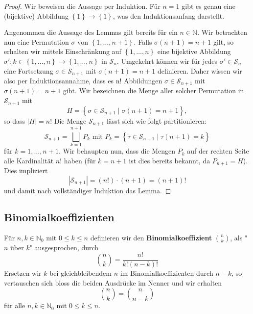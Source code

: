 \documentclass[../Analysis1_script.tex]{subfiles}
\begin{document}
\begin{proof}
	Wir beweisen die Aussage per Induktion. Für $n=1$ gibt es genau eine (bijektive) Abbildung $\left \lbrace {1} \right \rbrace \to \left \lbrace {1} \right \rbrace$, was den Induktionsanfang darstellt. 
	
	Angenommen die Aussage des Lemmas gilt bereits für ein $n\in \mathbb {N}$. Wir betrachten nun eine Permutation $\sigma$ von $\left \lbrace {1,\ldots ,n+1} \right \rbrace$. Falls $\sigma (n+1) = n+1$ gilt, so erhalten wir mittels Einschränkung auf $\left \lbrace {1,\ldots ,n} \right \rbrace$ eine bijektive Abbildung $\sigma ': k \in \left \lbrace {1,\ldots ,n} \right \rbrace \to \left \lbrace {1,\ldots ,n} \right \rbrace$ in $\mathcal {S}_n$. Umgekehrt können wir für jedes $\sigma '\in \mathcal {S}_n$ eine Fortsetzung $\sigma \in \mathcal {S}_{n+1}$ mit $\sigma (n+1)=n+1$ definieren. Daher wissen wir also per Induktionsannahme, dass es n! Abbildungen $\sigma \in \mathcal {S}_{n+1}$ mit $\sigma (n+1)=n+1$ gibt. Wir bezeichnen die Menge aller solcher Permutation in $\mathcal {S}_{n+1}$ mit 
	\[H=\left \lbrace {\sigma \in \mathcal {S}_{n+1}} \mid {\sigma (n+1)=n+1}\right \rbrace ,\]
	so dass $|H|=n!$
	Die Menge $\mathcal {S}_{n+1}$ lässt sich wie folgt partitionieren:
	 \[\mathcal {S}_{n+1} = \bigsqcup _{k=1}^{n+1}P_k\text { mit } P_k=\left \lbrace {\tau \in \mathcal {S}_{n+1}} \mid {\tau (n+1) = k}\right \rbrace\]
für $k=1,\ldots ,n+1$. Wir behaupten nun, dass die Mengen $P_k$ auf der rechten Seite alle Kardinalität $n!$ haben (für $k=n+1$ ist dies bereits bekannt, da $P_{n+1}=H$). Dies impliziert 
	 \[|\mathcal {S}_{n+1}| = (n!)\cdot (n+1) = (n+1)!\]
und damit nach vollständiger Induktion das Lemma.
\end{proof}

\subsection{Binomialkoeffizienten}

Für $n, k \in \mathbb{N}_0$ mit $0 \leq k \leq n$ definieren wir den \textbf{Binomialkoeffizient} $\binom{n}{k}$, als "$n$ über $k$" ausgesprochen, durch 
\[\binom{n}{k} = \frac{n!}{k!(n-k)!}\]
Ersetzen wir $k$ bei gleichbleibendem $n$ im Binomialkoeffizienten durch $n - k$, so vertauschen sich bloss die beiden Ausdrücke im Nenner und wir erhalten
\[\binom{n}{k} = \binom{n}{n-k}\]
für alle $n, k \in \mathbb{N}_0$ mit $0 \leq k \leq n$.
\end{document}

